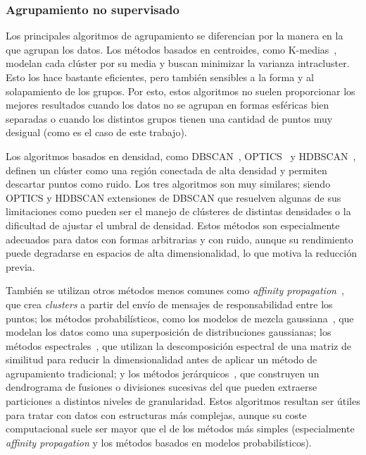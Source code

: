 \subsubsection{Agrupamiento no supervisado}
\label{subsubsec:agrupamiento}
Los principales algoritmos de agrupamiento se diferencian por la manera en la
que agrupan los datos. Los métodos basados en centroides, como
K-medias~\cite{arthur_k-means_2007},
modelan cada clúster por su media y buscan minimizar la varianza intracluster.
Esto los hace bastante eficientes, pero también sensibles a la forma y al
solapamiento de los grupos. Por esto, estos algoritmos no suelen proporcionar
los mejores resultados cuando los datos no se agrupan en formas esféricas bien
separadas o cuando los distintos grupos tienen una cantidad de puntos muy
desigual (como es el caso de este trabajo).

Los algoritmos basados en densidad, como
DBSCAN~\cite{ester_density-based_1996}, OPTICS~\cite{ankerst_optics_1999} y
HDBSCAN~\cite{campello_density-based_2013}, definen un clúster como una región
conectada de alta densidad y permiten descartar puntos como ruido. Los tres
algoritmos son muy similares; siendo OPTICS y HDBSCAN extensiones de DBSCAN que
resuelven algunas de sus limitaciones como pueden ser el manejo de clústeres de
distintas densidades o la dificultad de ajustar el umbral de densidad. Estos
métodos son especialmente adecuados para datos con formas arbitrarias y con
ruido, aunque su rendimiento puede degradarse en espacios de alta
dimensionalidad, lo que motiva la reducción previa.

También se utilizan otros métodos menos comunes como \textit{affinity
propagation}~\cite{frey_clustering_2007}, que crea \textit{clusters} a partir del envío de mensajes de
responsabilidad entre los puntos; los métodos probabilísticos, como los modelos
de mezcla gaussiana~\cite{dempster_maximum_1977}, que modelan los datos como una superposición de
distribuciones gaussianas; los métodos espectrales~\cite{ng_spectral_2001}, que utilizan la
descomposición espectral de una matriz de similitud para reducir la
dimensionalidad antes de aplicar un método de agrupamiento tradicional; y los
métodos jerárquicos~\cite{mullner_modern_2011}, que construyen un dendrograma de fusiones o divisiones
sucesivas del que pueden extraerse particiones a distintos niveles de
granularidad. Estos algoritmos resultan ser útiles para tratar con datos con
estructuras más complejas, aunque su coste computacional suele ser mayor que el
de los métodos más simples (especialmente \textit{affinity propagation} y los
métodos basados en modelos probabilísticos).

